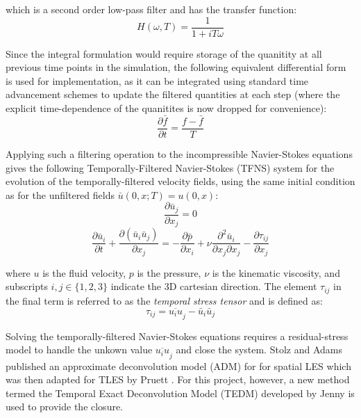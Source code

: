 which is a second order low-pass filter and has the transfer function:
\begin{equation}
H(\omega,T)=\frac{1}{1+iT\omega}
\end{equation}

Since the integral formulation would require storage of the quanitity at all previous time points in the simulation, the following equivalent differential form is used for implementation, as it can be integrated using standard time advancement schemes to update the filtered quantities at each step (where the explicit time-dependence of the quanitites is now dropped for convenience):
\begin{equation} \label{filter_diff}
\frac{\partial \bar{f}}{\partial t}=\frac{f-\bar{f}}{T}
\end{equation}

Applying such a filtering operation to the incompressible Navier-Stokes equations gives the following Temporally-Filtered Navier-Stokes (TFNS) system for the evolution of the temporally-filtered velocity fields, using the same initial condition as for the unfiltered fields $\bar{u}(0,x;T)=u(0,x)$:
\begin{equation} \label{div}
\frac{\partial \bar{u}_j}{\partial x_j}=0
\end{equation}
\begin{equation} \label{TFNS}
\frac{\partial \bar{u}_i}{\partial t}+\frac{\partial (\bar{u}_i\bar{u}_j)}{\partial x_j}=-\frac{\partial \bar{p}}{\partial x_i}+\nu \frac{\partial^2 \bar{u}_i}{\partial x_j \partial x_j}-\frac{\partial \tau_{ij}}{\partial x_j}
\end{equation}

where $u$ is the fluid velocity, $p$ is the pressure, $\nu$ is the kinematic viscosity, and subscripts $i,j\in\{1,2,3\}$ indicate the 3D cartesian direction. The element $\tau_{ij}$ in the final term is referred to as the \emph{temporal stress tensor} and is defined as:
\begin{equation}
\tau_{ij}=\overline{u_i u}_j-\bar{u}_i\bar{u}_j
\end{equation}

Solving the temporally-filtered Navier-Stokes equations requires a residual-stress model to handle the unkown value $\overline{u_i u}_j$ and close the system. Stolz and Adams \cite{Stolz2001} published an approximate deconvolution model (ADM) for for spatial LES which was then adapted for TLES by Pruett \cite{Pruett2008}. For this project, however, a new method termed the Temporal Exact Deconvolution Model (TEDM) developed by Jenny \cite{Jenny2016} is used to provide the closure.

